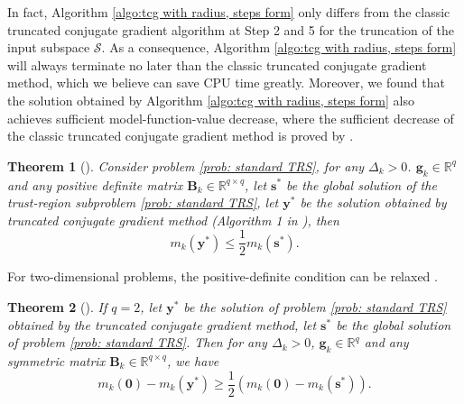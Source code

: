 \documentclass[colorlinks=true, linkcolor=blue, citecolor=blue, urlcolor=blue]{article}
\theoremstyle{plain}
\newtheorem{theorem}{Theorem}[section]
\theoremstyle{definition}
\theoremstyle{remark}
\newcommand{\RR}{\mathbb{R}}
\begin{document}
In fact, Algorithm \ref{algo:tcg with radius, steps form} only differs from the classic truncated conjugate gradient algorithm at Step 2 and 5 for the truncation of the input subspace $\mathcal{S}$. As a consequence, Algorithm \ref{algo:tcg with radius, steps form} will always terminate no later than the classic truncated conjugate gradient method, which we believe can save CPU time greatly. Moreover, we found that the solution obtained by Algorithm \ref{algo:tcg with radius, steps form} also achieves sufficient model-function-value decrease, where the sufficient decrease of the classic truncated conjugate gradient method is proved by \citet{2000On}.
\begin{theorem}[\citet{2000On}]
    Consider problem \eqref{prob: standard TRS}, for any $\Delta_k>0$. $\bm g_k\in\mathbb{R}^q$ and any positive definite matrix $\bm B_k\in\mathbb{R}^{q\times q}$, let $\bm s^*$ be the global solution of the trust-region subproblem \eqref{prob: standard TRS}, let $\bm y^*$ be the solution obtained by truncated conjugate gradient method (Algorithm 1 in \cite{2000On}), then
    \begin{equation*}
        m_k(\bm y^*)\leq \frac{1}{2}m_k(\bm s^*).
    \end{equation*}
\end{theorem}
For two-dimensional problems, the positive-definite condition can be relaxed \cite{2000On}.

\begin{theorem}[\citet{2000On}]
    If $q=2$, let $\bm y^*$ be the solution of problem \eqref{prob: standard TRS} obtained by the truncated conjugate gradient method, let $\bm s^*$ be the global solution of problem \eqref{prob: standard TRS}. Then for any $\Delta_k>0$, $\bm g_k\in\mathbb{R}^q$ and any symmetric matrix $\bm B_k\in\RR^{q\times q}$, we have 
    \begin{equation*}
    m_k(\bm 0)-m_k(\bm y^*)\geq \frac{1}{2}\left(m_k(\bm 0)-m_k(\bm s^*)\right).
\end{equation*}
\end{theorem}
\end{document}
